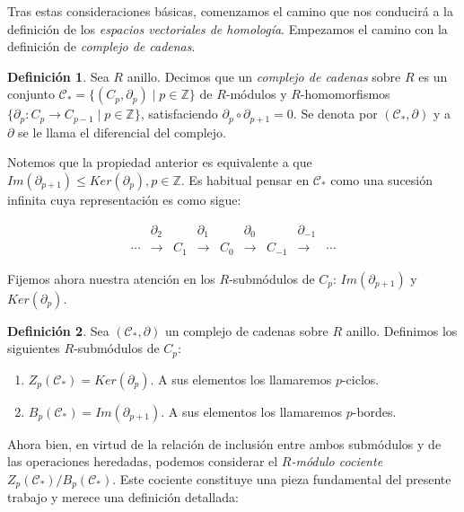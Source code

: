 \documentclass[12pt, a4paper, twoside]{book}
\numberwithin{equation}{section}
\theoremstyle{definition}
\newtheorem{defi}{Definición}
\theoremstyle{remark}
\theoremstyle{plain}
\begin{document}
	Tras estas consideraciones básicas, comenzamos el camino que nos 
	conducirá a la definición de los \emph{espacios vectoriales de 
	homología}. Empezamos el camino con la definición de \emph{complejo de 
	cadenas}.

	\begin{defi}
	Sea $R$ anillo. Decimos que un \textit{complejo de cadenas} sobre $R$ 
	es un conjunto $\mathcal{C}_{*}=\{(C_{p},\partial_{p}) \mid p \in 
	\mathbb{Z}\}$
	de $R$-módulos y $R$-homomorfismos $\{\partial_{p}: C_{p} \rightarrow 
	C_{p-1} \mid p \in \mathbb{Z}\}$, satisfaciendo $\partial_{p}\circ 
	\partial_{p+1}=0$. Se denota por $(\mathcal{C}_{*},\partial)$ y a 
	$\partial$ se le llama el diferencial del complejo.
	\end{defi}

	Notemos que la propiedad anterior es equivalente a que 
	$Im(\partial_{p+1}) \leq Ker(\partial_{p}), p \in \mathbb{Z}$. Es 
	habitual pensar en $\mathcal{C}_{*}$ como una sucesión infinita cuya
	representación es como sigue:

	\begin{equation*}
		 \left.
		\begin{array}{ccccccccc}
			 & \partial_{2} &  & \partial_{1} &  & 
			\partial_{0} &  & \partial_{-1} & \\ 
			\cdots & \longrightarrow & C_{1}& 
			\longrightarrow & C_{0} 
					& \longrightarrow 
			& C_{-1} & 
			\longrightarrow & \cdots 
		\end{array}
		\right. 
	\end{equation*}

	Fijemos ahora nuestra atención en los $R$-submódulos de $C_{p}$: 
	$Im(\partial_{p+1})$ y $Ker(\partial_{p})$.

	\begin{defi}
		Sea $(\mathcal{C}_{*},\partial)$ un complejo de cadenas sobre 
		$R$ anillo. 
		Definimos los siguientes $R$-submódulos de $C_{p}$:
		\begin{enumerate}
			\item $Z_{p}(\mathcal{C}_{*})=Ker(\partial_{p})$. A 
				sus elementos los llamaremos $p$-ciclos.
			\item $B_{p}(\mathcal{C}_{*})=Im(\partial_{p+1})$. A 
				sus elementos los llamaremos $p$-bordes.
		\end{enumerate}
	\end{defi}

	Ahora bien, en virtud de la relación de inclusión entre ambos 
	submódulos y de las operaciones heredadas, podemos considerar el 
	\emph{$R$-módulo cociente} $Z_{p}(\mathcal{C}_{*})/B_{p}(
	\mathcal{C}_{*})$. Este cociente constituye una pieza fundamental del 
	presente trabajo y merece una definición detallada:
\end{document}
